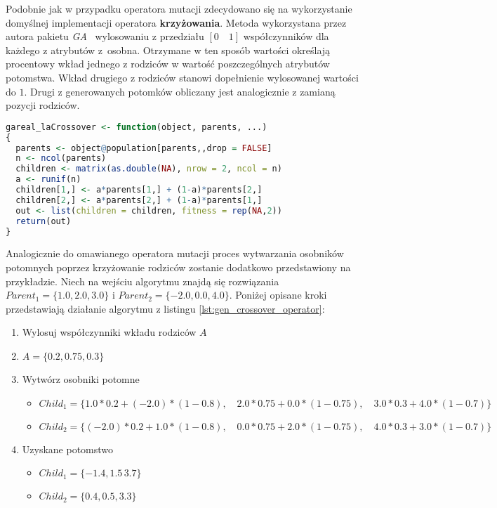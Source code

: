 \par
Podobnie jak w przypadku operatora mutacji zdecydowano się na wykorzystanie domyślnej implementacji operatora \textbf{krzyżowania}. Metoda wykorzystana przez autora pakietu \emph{GA}~\cite{gaPackage} wylosowaniu z przedziału $[0\quad1]$ współczynników dla każdego z atrybutów z~osobna. Otrzymane w ten sposób wartości określają procentowy wkład jednego z rodziców w wartość poszczególnych atrybutów potomstwa. Wkład drugiego z rodziców stanowi dopełnienie wylosowanej wartości do $1$. Drugi z generowanych potomków obliczany jest analogicznie z zamianą pozycji rodziców. 

\begin{lstlisting}[caption=Zastosowany operator krzyżowania z pakietu \emph{GA} dla języka \emph{R}, label=lst:gen_crossover_operator, mathescape, breaklines=true, language=R]
gareal_laCrossover <- function(object, parents, ...)
{
  parents <- object@population[parents,,drop = FALSE]
  n <- ncol(parents)
  children <- matrix(as.double(NA), nrow = 2, ncol = n)
  a <- runif(n)
  children[1,] <- a*parents[1,] + (1-a)*parents[2,]
  children[2,] <- a*parents[2,] + (1-a)*parents[1,]
  out <- list(children = children, fitness = rep(NA,2))
  return(out)
}
\end{lstlisting}
Analogicznie do omawianego operatora mutacji proces wytwarzania osobników potomnych poprzez krzyżowanie rodziców zostanie dodatkowo przedstawiony na przykładzie. Niech na wejściu algorytmu znajdą się rozwiązania $Parent_1 = \lbrace1.0, 2.0, 3.0\rbrace$ i $Parent_2 = \lbrace-2.0, 0.0, 4.0\rbrace$. Poniżej opisane kroki przedstawiają działanie algorytmu z listingu \ref{lst:gen_crossover_operator}:
\begin{enumerate}
\item Wylosuj współczynniki wkładu rodziców $A$
\item $A=\lbrace0.2, 0.75, 0.3\rbrace$
\item Wytwórz osobniki potomne
\begin{itemize}
\item $Child_1 = \lbrace1.0*0.2+(-2.0)*(1-0.8),\quad 2.0*0.75+0.0*(1-0.75),\quad 3.0*0.3+4.0*(1-0.7)\rbrace$
\item $Child_2 = \lbrace(-2.0)*0.2+1.0*(1-0.8),\quad 0.0*0.75+2.0*(1-0.75),\quad 4.0*0.3+3.0*(1-0.7)\rbrace$
\end{itemize}
\item Uzyskane potomstwo
\begin{itemize}
\item $Child_1 = \lbrace-1.4,1.5\, 3.7\rbrace$
\item $Child_2 = \lbrace0.4, 0.5, 3.3\rbrace$
\end{itemize}
\end{enumerate}

